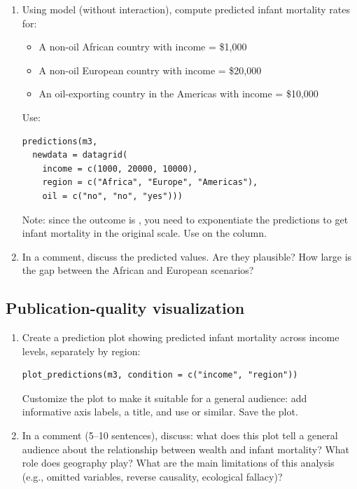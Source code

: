 \begin{enumerate}[label=\alph*)]
  \item Using model  (without interaction), compute predicted infant mortality rates for:
  \begin{itemize}
    \item A non-oil African country with income = \$1,000
    \item A non-oil European country with income = \$20,000
    \item An oil-exporting country in the Americas with income = \$10,000
  \end{itemize}
  Use:
  \begin{lstlisting}
predictions(m3,
  newdata = datagrid(
    income = c(1000, 20000, 10000),
    region = c("Africa", "Europe", "Americas"),
    oil = c("no", "no", "yes")))
  \end{lstlisting}
  Note: since the outcome is , you need to exponentiate the predictions to get infant mortality in the original scale. Use  on the  column.
  \item In a comment, discuss the predicted values. Are they plausible? How large is the gap between the African and European scenarios?
\end{enumerate}

\subsection{Publication-quality visualization}

\begin{enumerate}[label=\alph*)]
  \item Create a prediction plot showing predicted infant mortality across income levels, separately by region:
  \begin{lstlisting}
plot_predictions(m3, condition = c("income", "region"))
  \end{lstlisting}
  Customize the plot to make it suitable for a general audience: add informative axis labels, a title, and use  or similar. Save the plot.
  \item In a comment (5--10 sentences), discuss: what does this plot tell a general audience about the relationship between wealth and infant mortality? What role does geography play? What are the main limitations of this analysis (e.g., omitted variables, reverse causality, ecological fallacy)?
\end{enumerate}

